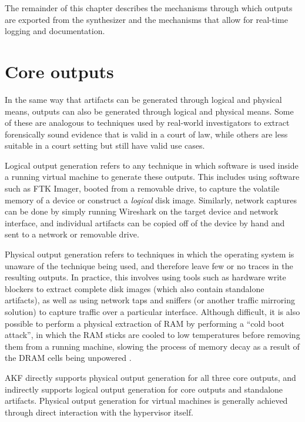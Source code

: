 The remainder of this chapter describes the mechanisms through which
outputs are exported from the synthesizer and the mechanisms that allow
for real-time logging and documentation.

\section{Core outputs}\label{core-outputs}

In the same way that artifacts can be generated through logical and
physical means, outputs can also be generated through logical and
physical means. Some of these are analogous to techniques used by
real-world investigators to extract forensically sound evidence that is
valid in a court of law, while others are less suitable in a court
setting but still have valid use cases.

Logical output generation refers to any technique in which software is
used inside a running virtual machine to generate these outputs. This
includes using software such as FTK Imager, booted from a removable
drive, to capture the volatile memory of a device or construct a
\emph{logical} disk image. Similarly, network captures can be done by
simply running Wireshark on the target device and network interface, and
individual artifacts can be copied off of the device by hand and sent to
a network or removable drive.

Physical output generation refers to techniques in which the operating
system is unaware of the technique being used, and therefore leave few
or no traces in the resulting outputs. In practice, this involves using
tools such as hardware write blockers to extract complete disk images
(which also contain standalone artifacts), as well as using network taps
and sniffers (or another traffic mirroring solution) to capture traffic
over a particular interface. Although difficult, it is also possible to
perform a physical extraction of RAM by performing a ``cold boot
attack'', in which the RAM sticks are cooled to low temperatures before
removing them from a running machine, slowing the process of memory
decay as a result of the DRAM cells being unpowered
\cite{yitbarekColdBootAttacks2017}.

AKF directly supports physical output generation for all three core
outputs, and indirectly supports logical output generation for core
outputs and standalone artifacts. Physical output generation for virtual
machines is generally achieved through direct interaction with the
hypervisor itself.

